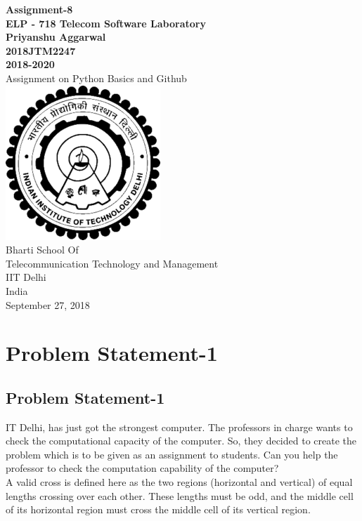 \documentclass[a4paper,12pt]{article}
\begin{document}
\begin{center}
\textbf{Assignment-8 \\
\vspace{5mm}
ELP - 718 Telecom Software Laboratory \\
\vspace{2mm}
Priyanshu Aggarwal \\
2018JTM2247 \\
2018-2020} \\
\vspace{10mm}
 Assignment on Python Basics and Github\\
\vspace{30mm}
\includegraphics[scale=0.5]{iitlogo.png} \\
\vspace{10mm}
Bharti School Of \\
Telecommunication Technology and Management \\
IIT Delhi \\
India \\
September 27, 2018
\newpage
\tableofcontents
\newpage
\listoffigures
\newpage
\end{center}

\section{\large{Problem Statement-1}}
\subsection{Problem Statement-1}
IT Delhi, has just got the strongest computer. The professors in charge wants to check the computational capacity of the computer. So, they decided to create the problem which is to be given as an assignment to students. Can you help the professor to check the computation capability of the computer?\\
A valid cross is defined here as the two regions (horizontal and vertical) of equal lengths crossing over each other. These lengths must be odd, and the middle cell of its horizontal region must cross the middle cell of its vertical region.\\
\end{document}
